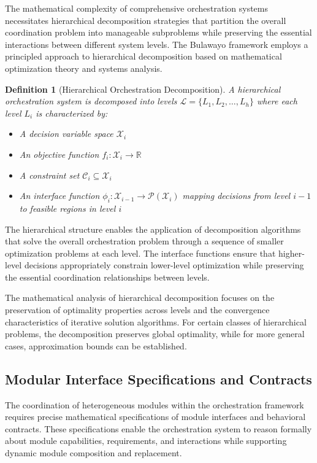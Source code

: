 \documentclass[12pt,a4paper]{article}
\newtheorem{definition}[theorem]{Definition}
\begin{document}
The mathematical complexity of comprehensive orchestration systems necessitates hierarchical decomposition strategies that partition the overall coordination problem into manageable subproblems while preserving the essential interactions between different system levels. The Bulawayo framework employs a principled approach to hierarchical decomposition based on mathematical optimization theory and systems analysis.

\begin{definition}[Hierarchical Orchestration Decomposition]
A hierarchical orchestration system is decomposed into levels $\mathcal{L} = \{L_1, L_2, \ldots, L_h\}$ where each level $L_i$ is characterized by:
\begin{itemize}
\item A decision variable space $\mathcal{X}_i$
\item An objective function $f_i : \mathcal{X}_i \rightarrow \mathbb{R}$
\item A constraint set $\mathcal{C}_i \subseteq \mathcal{X}_i$
\item An interface function $\phi_i : \mathcal{X}_{i-1} \rightarrow \mathcal{P}(\mathcal{X}_i)$ mapping decisions from level $i-1$ to feasible regions in level $i$
\end{itemize}
\end{definition}

The hierarchical structure enables the application of decomposition algorithms that solve the overall orchestration problem through a sequence of smaller optimization problems at each level. The interface functions ensure that higher-level decisions appropriately constrain lower-level optimization while preserving the essential coordination relationships between levels.

The mathematical analysis of hierarchical decomposition focuses on the preservation of optimality properties across levels and the convergence characteristics of iterative solution algorithms. For certain classes of hierarchical problems, the decomposition preserves global optimality, while for more general cases, approximation bounds can be established.

\subsection{Modular Interface Specifications and Contracts}

The coordination of heterogeneous modules within the orchestration framework requires precise mathematical specifications of module interfaces and behavioral contracts. These specifications enable the orchestration system to reason formally about module capabilities, requirements, and interactions while supporting dynamic module composition and replacement.
\end{document}
